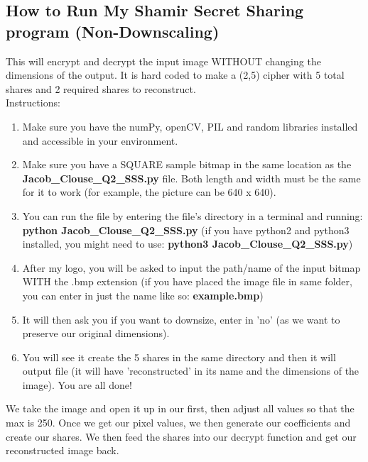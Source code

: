 \documentclass[10pt]{article}
\begin{document}
\subsection{How to Run My Shamir Secret Sharing program (Non-Downscaling) } 
\noindent This will encrypt and decrypt the input image WITHOUT changing the dimensions of the output. It is hard coded to make a (2,5) cipher with 5 total shares and 2 required shares to reconstruct. \\ Instructions: 
\begin{enumerate}
	\item Make sure you have the numPy, openCV, PIL and random libraries installed and accessible in your environment.
	
	\item Make sure you have a SQUARE sample bitmap in the same location as the \textbf{Jacob\_Clouse\_Q2\_SSS.py} file. Both length and width must be the same for it to work (for example, the picture can be 640 x 640).
	
	\item You can run the file by entering the file's directory in a terminal and running: \textbf{python Jacob\_Clouse\_Q2\_SSS.py} (if you have python2 and python3 installed, you might need to use: \textbf{python3 Jacob\_Clouse\_Q2\_SSS.py})
	
	\item After my logo, you will be asked to input the path/name of the input bitmap WITH the .bmp extension (if you have placed the image file in same folder, you can enter in just the name like so: \textbf{example.bmp})
	
	\item It will then ask you if you want to downsize, enter in 'no' (as we want to preserve our original dimensions). 
	
	\item You will see it create the 5 shares in the same directory and then it will output file (it will have 'reconstructed' in its name and the dimensions of the image). You are all done!
\end{enumerate}
\vspace{.1in}
\noindent We take the image and open it up in our first, then adjust all values so that the max is 250. Once we get our pixel values, we then generate our coefficients and create our shares. We then feed the shares into our decrypt function and get our reconstructed image back. 
\vspace{0.2in}
\end{document}
